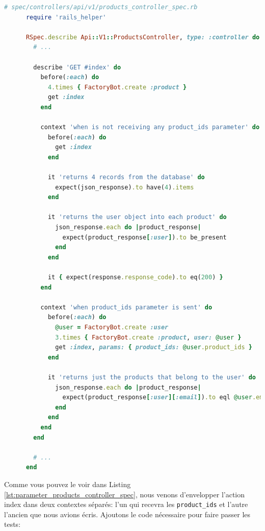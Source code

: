 \documentclass[]{report}
\begin{document}
    \begin{scriptsize}
      \begin{lstlisting}[language=ruby, caption={Tests du paramètre d'identifiants des produits pour l'affichage de l'index des produits}, label={lst:parameter_products_controller_spec}]
      # spec/controllers/api/v1/products_controller_spec.rb
      require 'rails_helper'

      RSpec.describe Api::V1::ProductsController, type: :controller do
        # ...

        describe 'GET #index' do
          before(:each) do
            4.times { FactoryBot.create :product }
            get :index
          end

          context 'when is not receiving any product_ids parameter' do
            before(:each) do
              get :index
            end

            it 'returns 4 records from the database' do
              expect(json_response).to have(4).items
            end

            it 'returns the user object into each product' do
              json_response.each do |product_response|
                expect(product_response[:user]).to be_present
              end
            end

            it { expect(response.response_code).to eq(200) }
          end

          context 'when product_ids parameter is sent' do
            before(:each) do
              @user = FactoryBot.create :user
              3.times { FactoryBot.create :product, user: @user }
              get :index, params: { product_ids: @user.product_ids }
            end

            it 'returns just the products that belong to the user' do
              json_response.each do |product_response|
                expect(product_response[:user][:email]).to eql @user.email
              end
            end
          end
        end

        # ...
      end
      \end{lstlisting}
    \end{scriptsize}

    Comme vous pouvez le voir dans Listing \ref{lst:parameter_products_controller_spec}, nous venons d'envelopper l'action index dans deux contextes séparés: l'un qui recevra les \verb|product_ids| et l'autre l'ancien que nous avions écris. Ajoutons le code nécessaire pour faire passer les tests:
\end{document}
